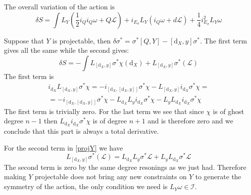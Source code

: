 \documentclass[a4paper,12pt]{article}
\numberwithin{equation}{section} %
\newcommand{\dx}{\mathrm{d}_X}
\def\cI{\mathcal{I}}
\def\cL{\mathcal{L}}
\begin{document}
The overall variation of the action is 
\begin{equation}
    \delta S = \int L_Y(\frac{1}{2}i_Qi_Q\omega + Q\cL) + i_{E_\sigma}L_Y(i_Q\omega + d\cL) + \frac{1}{4}i^2_{E_\sigma}L_Y\omega
\end{equation}

Suppose that $Y$ is projectable, then $\delta \sigma^* = \sigma^*[Q,Y] - [\dx,y]\sigma^*$. The first term gives all the same while the second gives:
\begin{equation} \label{projY}
    \delta S = -\int L_{[\dx,y]}\sigma^*\chi(\dx) + L_{[\dx,y]}\sigma^*(\cL)
\end{equation}
The first term is 
\begin{equation}
\begin{gathered}
    i_{\dx} L_{[\dx,y]}\sigma^*\chi = - i_{[\dx,[\dx,y]]}\sigma^*\chi  - L_{[\dx,y]}i_{\dx}\sigma^*\chi = \\ = - i_{[\dx,[\dx,y]]}\sigma^*\chi - L_{\dx}L_y i_{\dx}\sigma^*\chi -L_y L_{\dx}i_{\dx}\sigma^*\chi
\end{gathered}
\end{equation}
The first term is trivially zero. For the last term we see that since $\chi$ is of ghost degree $n-1$ then $L_{\dx}i_{\dx}\sigma^*\chi$ is of degree $n+1$ and is therefore zero and we conclude that this part is always a total derivative.

For the second term in \eqref{projY} we have 
\begin{equation}
    L_{[\dx,y]}\sigma^*(\cL) = L_{\dx}L_y\sigma^*\cL + L_y L_{\dx}\sigma^*\cL
\end{equation}
The second term is zero by the same degree resonings as we just had. Therefore making $Y$ projectable does not bring any new constraints on $Y$ to generate the symmetry of the action, the only condition we need is $L_Y\omega \in \cI$.


\end{document}

